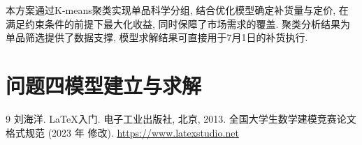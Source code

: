 \documentclass{cumcmthesis}
\begin{document}
本方案通过K-means聚类实现单品科学分组, 结合优化模型确定补货量与定价, 在满足约束条件的前提下最大化收益, 同时保障了市场需求的覆盖. 聚类分析结果为单品筛选提供了数据支撑, 模型求解结果可直接用于7月1日的补货执行. 
\section{问题四模型建立与求解}%


\begin{thebibliography}{9}%
    刘海洋.
    \newblock \LaTeX {}入门\allowbreak[J].
    \newblock 电子工业出版社, 北京, 2013.
    全国大学生数学建模竞赛论文格式规范 (2023 年 修改).
     \url{https://www.latexstudio.net}
\end{thebibliography}
\end{document}
